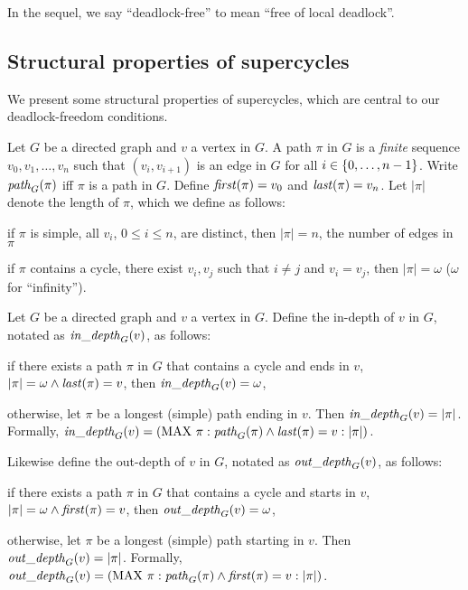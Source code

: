 In the sequel, we say ``deadlock-free'' to mean ``free of local deadlock''.



\subsection{Structural properties of supercycles}

We present some structural properties of supercycles, which
are central to our deadlock-freedom conditions.


 \label{def:path}
Let $G$ be a directed graph and $v$ a vertex in $G$. A path $\pi$ in $G$ is a \emph{finite} sequence
$v_0, v_1, \ldots,v_n$ such that $(v_i, v_{i+1})$ is an edge in $G$ for all $i \in \{ 0,\ldots,n-1 \}$.
Write $\mathit{path}_{G}(\pi)$ iff $\pi$ is a path in $G$.
Define $\mathit{first}(\pi) = v_0$ and $\mathit{last}(\pi) = v_n$. 
%
Let $|\pi|$ denote the length of $\pi$, which we define as follows:
\be
\item if $\pi$ is simple, \ie all $v_i$, $0 \le i \le n$, are distinct, then $|\pi| = n$, \ie the
number of edges in $\pi$
\item if $\pi$ contains a cycle, \ie there exist $v_i, v_j$ such that $i \ne j$ and $v_i = v_j$, then
$|\pi| = \omega$ ($\omega$ for ``infinity'').
\ee

\ed

 \label{def:depth} 
Let $G$ be a directed graph and $v$ a vertex in $G$. Define the in-depth of $v$ in $G$, notated as
$\mathit{in\_depth}_{G}({v})$, as follows:
\be
\item if there exists a path $\pi$ in $G$ that contains a cycle and ends in $v$, \ie $|\pi| = \omega
  \land \mathit{last}(\pi) = v$, then $\mathit{in\_depth}_{G}({v}) = \omega$,

\item otherwise, let $\pi$ be a longest (simple) path ending in $v$. Then $\mathit{in\_depth}_{G}({v}) = |\pi|$.
\ee
Formally, $\mathit{in\_depth}_{G}({v}) = (\mathrm{MAX}\ \pi : \mathit{path}_{G}(\pi) \land \mathit{last}(\pi) = v : |\pi|)$.

Likewise define the out-depth of $v$ in $G$, notated as
$\mathit{out\_depth}_{G}({v})$, as follows:
\be
\item if there exists a path $\pi$ in $G$ that contains a cycle and starts in $v$, \ie $|\pi| = \omega
  \land \mathit{first}(\pi) = v$, then $\mathit{out\_depth}_{G}({v}) = \omega$,

\item otherwise, let $\pi$ be a longest (simple) path starting in $v$. Then $\mathit{out\_depth}_{G}({v}) = |\pi|$.
\ee
Formally, $\mathit{out\_depth}_{G}({v}) = (\mathrm{MAX}\ \pi : \mathit{path}_{G}(\pi) \land \mathit{first}(\pi) = v : |\pi|)$.
\ed

